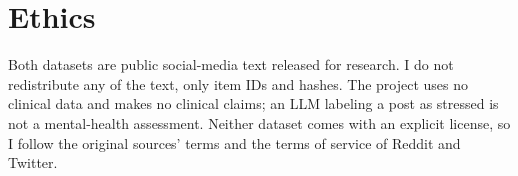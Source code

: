 \documentclass[10pt,twocolumn]{article}
\begin{document}
\section{Ethics}
Both datasets are public social-media text released for research. I do not redistribute any of
the text, only item IDs and hashes. The project uses no clinical data and makes no clinical
claims; an LLM labeling a post as stressed is not a mental-health assessment. Neither dataset
comes with an explicit license, so I follow the original sources' terms and the terms of
service of Reddit and Twitter.

\small


\end{document}

